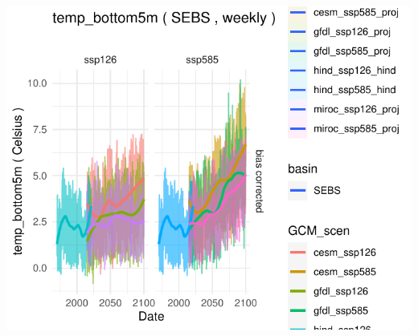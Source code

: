 \documentclass[
]{article}
\begin{document}
\begin{center}\includegraphics{ACLIM2_quickStart_files/figure-latex/sizespec-1} \end{center}
\end{document}
